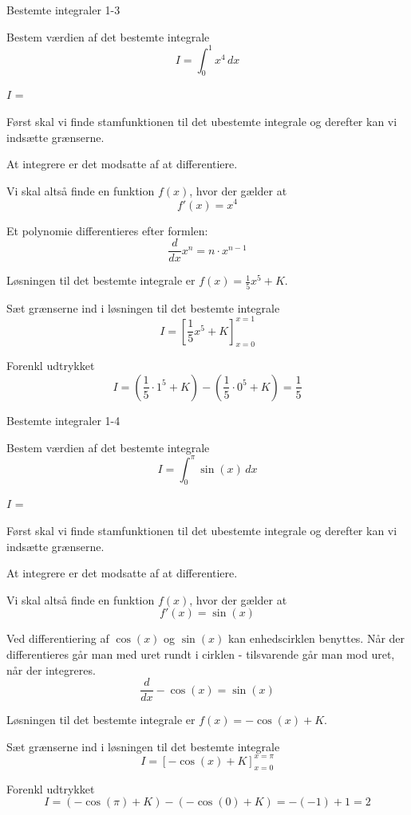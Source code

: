 \documentclass{article}
\begin{document}
\newpage

\begin{exercise}{Bestemte integraler 1-3}
	
	Bestem værdien af det bestemte integrale
	\[
	I = \int_0^1 x^4 \, dx
	\]
	
	$I$ =  
	
	
	\hint
	Først skal vi finde stamfunktionen til det ubestemte integrale og derefter kan vi indsætte grænserne.
	
	\hint
	At integrere er det modsatte af at differentiere.
	
	\hint
	Vi skal altså finde en funktion $f(x)$, hvor der gælder at
	\[
	f'(x) = x^4
	\]
	
	\hint
	Et polynomie differentieres efter formlen:
	\[
	\frac{d}{dx} x^n = n \cdot x^{n - 1}
	\]
	
	\hint
	Løsningen til det bestemte integrale er $f(x) = \frac{1}{5} x^5 + K$.
	
	\hint
	Sæt grænserne ind i løsningen til det bestemte integrale
	\[
	I = \left[ \frac{1}{5} x^5 + K \right]_{x=0}^{x=1}
	\]
	
	\hint
	Forenkl udtrykket
	\[
	I = \left( \frac{1}{5} \cdot 1^5 + K \right) - \left( \frac{1}{5} \cdot 0^5 + K \right) = \frac{1}{5}
	\]
	
	
\end{exercise}

\newpage

\begin{exercise}{Bestemte integraler 1-4}
	
	Bestem værdien af det bestemte integrale
	\[
	I = \int_0^{\pi} \sin(x) \, dx
	\]
	
	$I$ =  
	
	
	\hint
	Først skal vi finde stamfunktionen til det ubestemte integrale og derefter kan vi indsætte grænserne.
	
	\hint
	At integrere er det modsatte af at differentiere.
	
	\hint
	Vi skal altså finde en funktion $f(x)$, hvor der gælder at
	\[
	f'(x) = \sin(x)
	\]
	
	\hint
	Ved differentiering af $\cos(x)$ og $\sin(x)$ kan enhedscirklen benyttes. Når der differentieres går man med uret rundt i cirklen - tilsvarende går man mod uret, når der integreres. 
	\[
	\frac{d}{dx} - \cos(x) = \sin(x)
	\]
	
	\hint
	Løsningen til det bestemte integrale er $f(x) = -\cos(x) + K$.
	
	\hint
	Sæt grænserne ind i løsningen til det bestemte integrale
	\[
	I = \left[- \cos(x) + K \right]_{x=0}^{x=\pi}
	\]
	
	\hint
	Forenkl udtrykket
	\[
	I = \left( - \cos(\pi) + K \right) - \left( - \cos(0) + K \right) = - (-1) + 1 = 2
	\]
	
	
\end{exercise}
\end{document}
